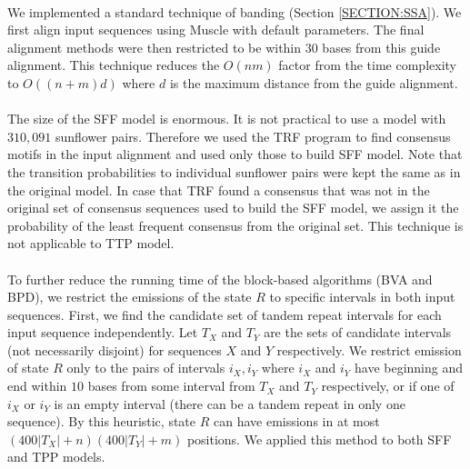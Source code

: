 \paragraph{}
We implemented a standard technique of banding (Section \ref{SECTION:SSA}). We
first align input sequences using Muscle \cite{Edgar2004} with default
parameters.  The final alignment methods were then restricted to be within 30
bases from this guide alignment. This technique reduces the $O(nm)$ factor from
the time complexity to $O((n+m)d)$ where $d$ is the maximum distance from the
guide alignment.

\paragraph{}
The size of the SFF model is enormous. It is not practical to use a model with
$310,091$ sunflower pairs. Therefore we used the TRF program \cite{Benson1999}
to find consensus motifs in the input alignment and used only those to build
SFF model. Note that the transition probabilities to individual sunflower pairs
were kept the same as in the original model. In case that TRF found a consensus
that was not in the original set of consensus sequences used to build the SFF
model, we assign it the probability of the least frequent consensus from the
original set. This technique is not applicable to TTP model.

\paragraph{}
To further reduce the running time of the block-based algorithms (BVA and BPD),
we restrict the emissions of the state $R$ to specific intervals in both input
sequences. First, we find the candidate set of tandem repeat intervals for
each input sequence independently. Let $T_X$ and $T_Y$ are the
sets of candidate intervals (not necessarily disjoint) for sequences $X$ and
$Y$ respectively. We restrict emission of state $R$ only to the pairs of
intervals $i_X, i_Y$ where $i_X$ and $i_Y$ have beginning and end within $10$
bases from some interval from $T_X$ and $T_Y$ respectively, or if one of $i_X$
or $i_Y$ is an empty interval (there can be a tandem repeat in only one
sequence).  By this heuristic, state $R$ can have emissions in at most
$(400|T_X|+n)(400|T_Y|+m)$ positions. We applied this method to both SFF and
TPP models.

